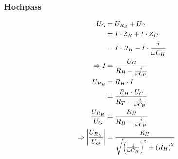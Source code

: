 \subsubsection{Hochpass}
\begin{align}
U_G &= U_{R_H} + U_C\notag\\
&= I \cdot Z_R + I \cdot Z_C\notag\\
&= I \cdot R_H - I \cdot \frac{i}{\omega C_H} \notag\\
\Rightarrow I &= \frac{U_G}{R_H - \frac{i}{\omega C_H}}\notag\\
U_{R_H} &= R_H \cdot I\notag\\
&= \frac{R_H \cdot U_G}{R_T - \frac{i}{\omega C_H}}\notag\\
\frac{U_{R_H}}{U_G} &= \frac{R_H}{R_H - \frac{i}{\omega C_H}}\notag\\
\Rightarrow \bigg\vert \frac{U_{R_H}}{U_G} \bigg\vert &= \frac{R_H}{\sqrt{
\left(\frac{1}{\omega C_H} \right)^2 +
\left(R_H\right)^2
}} \label{hochpass}
\end{align}
